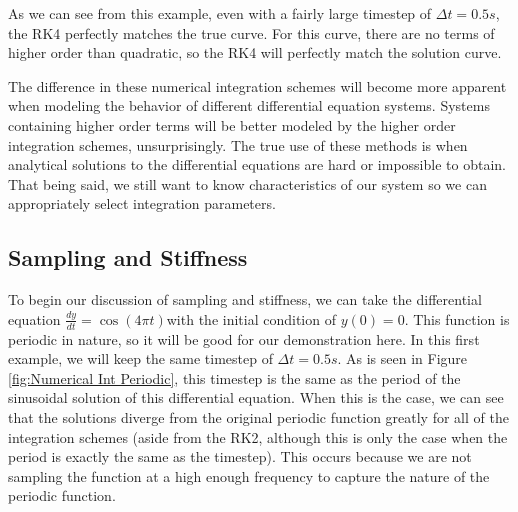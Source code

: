 \documentclass[12pt]{report}
\begin{document}
As we can see from this example, even with a fairly large timestep of $\Delta t=0.5s$, the RK4 perfectly matches the true curve. For this curve, there are no terms of higher order than quadratic, so the RK4 will perfectly match the solution curve.

The difference in these numerical integration schemes will become more apparent when modeling the behavior of different differential equation systems. Systems containing higher order terms will be better modeled by the higher order integration schemes, unsurprisingly. The true use of these methods is when analytical solutions to the differential equations are hard or impossible to obtain. That being said, we still want to know characteristics of our system so we can appropriately select integration parameters.

\subsection{Sampling and Stiffness}\label{sampling and stiffness}
 To begin our discussion of sampling and stiffness, we can take the differential equation $\frac{dy}{dt}=\cos(4\pi t)$with the initial condition of $y(0)=0$. This function is periodic in nature, so it will be good for our demonstration here. In this first example, we will keep the same timestep of $\Delta t=0.5s$. As is seen in Figure \ref{fig:Numerical Int Periodic}, this timestep is the same as the period of the sinusoidal solution of this differential equation. When this is the case, we can see that the solutions diverge from the original periodic function greatly for all of the integration schemes (aside from the RK2, although this is only the case when the period is exactly the same as the timestep). This occurs because we are not sampling the function at a high enough frequency to capture the nature of the periodic function.
\end{document}
